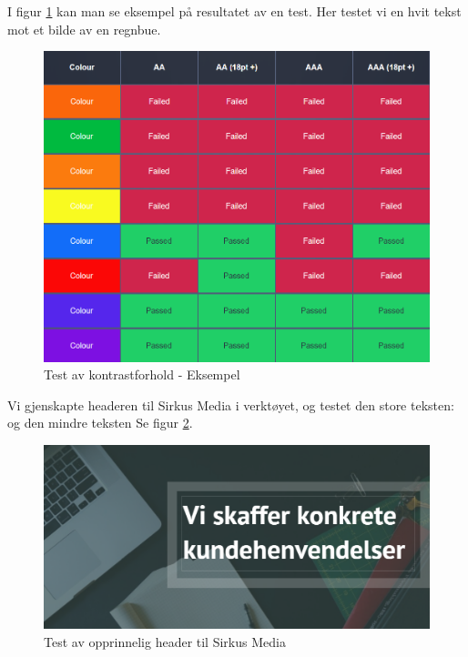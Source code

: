 I figur \ref{fig:analysis-current-a11y_bg-example} kan man se eksempel på resultatet av en test. Her testet vi en hvit tekst mot et bilde av en regnbue. 

\begin{figure}[H]
    \centering
    \includegraphics[width=\textwidth]{bjornar/bg-image-eksempel.png}
    \caption{Test av kontrastforhold - Eksempel}
    \label{fig:analysis-current-a11y_bg-example}
\end{figure}

Vi gjenskapte headeren til Sirkus Media i verktøyet, og testet den store teksten:  og den mindre teksten  Se figur \ref{fig:analysis-current-a11y_bg-generator}. 

\begin{figure}[H]
    \centering
    \includegraphics[width=\textwidth]{bjornar/bg-image-generator.png}
    \caption{Test av opprinnelig header til Sirkus Media}
    \label{fig:analysis-current-a11y_bg-generator}
\end{figure}

